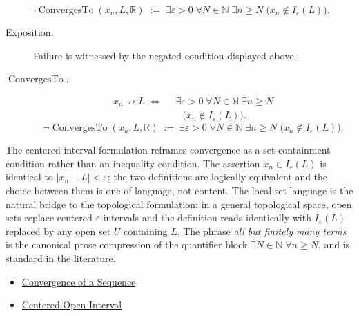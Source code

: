 \begin{remark*}
\[
\neg\operatorname{ConvergesTo}(x_n,L,\mathbb R)
\;:=\;
\exists \varepsilon > 0 \;\forall N \in \mathbb{N} \;\exists n \ge N
\;\bigl(x_n \notin I_\varepsilon(L)\bigr).
\]
\end{remark*}
\begin{remark*}
\begin{description}
  \item[Exposition.]
Failure is witnessed by the negated condition displayed above.
  \item[\(\operatorname{ConvergesTo}.\)]
\[
\begin{aligned}
x_n \not\to L
\;\Longleftrightarrow\;
&\;\exists \varepsilon > 0 \;\forall N \in \mathbb{N} \;\exists n \ge N\\
&\quad\bigl(x_n \notin I_\varepsilon(L)\bigr).
\end{aligned}
\]
\[
\neg\operatorname{ConvergesTo}(x_n,L,\mathbb R)
\;:=\;
\exists \varepsilon > 0 \;\forall N \in \mathbb{N} \;\exists n \ge N
\;\bigl(x_n \notin I_\varepsilon(L)\bigr).
\]
\end{description}
\end{remark*}

\begin{remark*}[Interpretation]
The centered interval formulation reframes convergence as a set-containment
condition rather than an inequality condition. The assertion $x_n \in
I_\varepsilon(L)$ is identical to $|x_n - L| < \varepsilon$; the two
definitions are logically equivalent and the choice between them is one
of language, not content. The local-set language is the natural
bridge to the topological formulation: in a general topological space,
open sets replace centered $\varepsilon$-intervals and the definition reads
identically with $I_\varepsilon(L)$ replaced by any open set $U$
containing $L$. The phrase \emph{all but finitely many terms} is the
canonical prose compression of the quantifier block $\exists N \in
\mathbb{N} \;\forall n \ge N$, and is standard in the literature.
\end{remark*}

\begin{dependencies}
\begin{itemize}
  \item \hyperref[def:convergent-sequence]{Convergence of a Sequence}
  \item \hyperref[def:epsilon-neighbourhood]{Centered Open Interval}
\end{itemize}
\end{dependencies}











